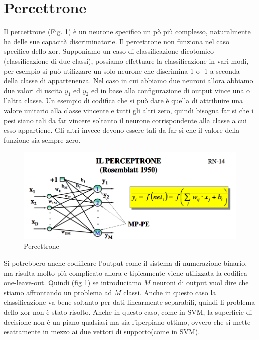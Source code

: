 \section{Percettrone}
\noindent Il percettrone (Fig. \ref{percet}) è un neurone specifico un pò più complesso, naturalmente ha delle sue capacità discriminatorie. Il percettrone non funziona nel caso specifico dello xor. Supponiamo un caso di classificazione dicotomico (classificazione di due classi), possiamo effettuare la classificazione in vari modi, per esempio si può utilizzare un solo neurone che discrimina 1 o -1 a seconda della classe di appartenenza. Nel caso in cui abbiamo due neuroni allora abbiamo due valori di uscita $y_1$ ed $y_2$ ed in base alla configurazione di output vince una o l'altra classe. Un esempio di codifica che si può dare è quella di attribuire una valore unitario alla classe vincente e tutti gli altri zero, quindi bisogna far si che i pesi siano tali da far vincere soltanto il neurone corrispondente alla classe a cui esso appartiene. Gli altri invece devono essere tali da far si che il valore della funzione sia sempre zero.
\begin{figure}
\centering
\includegraphics[scale=0.6]{img/percettrone.png}
\caption{Percettrone}
\label{percet}
\end{figure}
Si potrebbero anche codificare l'output come il sistema di numerazione binario, ma risulta molto più complicato allora e tipicamente viene utilizzata la codifica one-leave-out.  Quindi (fig \ref{percet}) se introduciamo $M$ neuroni di output vuol dire che stiamo affrontando un problema ad $M$ classi. Anche in questo caso la classificazione va bene soltanto per dati linearmente separabili, quindi li problema dello xor non è stato risolto. Anche in questo caso, come in SVM,  la superficie di decisione non è un piano qualsiasi ma sia l'iperpiano ottimo, ovvero che si mette esattamente in mezzo ai due vettori di supporto(come in SVM). 

